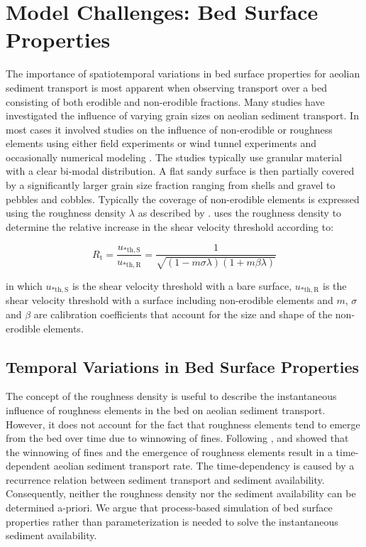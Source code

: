 \section{Model Challenges: Bed Surface Properties} \label{sec:challenges}

The importance of spatiotemporal variations in bed surface properties
for aeolian sediment transport is most apparent when observing
transport over a bed consisting of both erodible and non-erodible
fractions. Many studies have investigated the influence of varying
grain sizes on aeolian sediment transport. In most cases it involved
studies on the influence of non-erodible or roughness elements using
either field experiments \citep[e.g.][]{DavidsonArnott1997,
  Gillies2006, Tan2013} or wind tunnel experiments
\citep[e.g.][]{Gillette1989, Nickling1995, McKennaNeuman1995,
  Dong2004b, McKennaNeuman2012} and occasionally numerical modeling
\citep[e.g.][]{Turpin2010}. The studies typically use granular
material with a clear bi-modal distribution. A flat sandy surface is
then partially covered by a significantly larger grain size fraction
ranging from shells and gravel to pebbles and cobbles. Typically the
coverage of non-erodible elements is expressed using the roughness
density $\lambda$ as described by
\citet{Raupach1993}. \citet{Raupach1993} uses the roughness density to
determine the relative increase in the shear velocity threshold
according to:

\begin{equation} \label{eq:raupach}
R_{\mathrm{t}} = \frac{u_{\mathrm{* th, S}}}{u_{\mathrm{* th, R}}} = \frac{1}{\sqrt{(1 - m \sigma \lambda) (1 + m \beta \lambda)}}
\end{equation}

\noindent in which $u_{\mathrm{* th, S}}$ is the shear velocity
threshold with a bare surface, $u_{\mathrm{* th, R}}$ is the shear
velocity threshold with a surface including non-erodible elements and
$m$, $\sigma$ and $\beta$ are calibration coefficients that account
for the size and shape of the non-erodible elements.

\subsection{Temporal Variations in Bed Surface Properties}

The concept of the roughness density is useful to describe the
instantaneous influence of roughness elements in the bed on aeolian
sediment transport. However, it does not account for the fact that
roughness elements tend to emerge from the bed over time due to
winnowing of fines. Following \citet{Gillette1989},
\citet{Nickling1995} and \citet{McKennaNeuman1995} showed that the
winnowing of fines and the emergence of roughness elements result in a
time-dependent aeolian sediment transport rate. The time-dependency is
caused by a recurrence relation between sediment transport and
sediment availability. Consequently, neither the roughness density nor
the sediment availability can be determined a-priori. We argue that
process-based simulation of bed surface properties rather than
parameterization is needed to solve the instantaneous sediment
availability.

